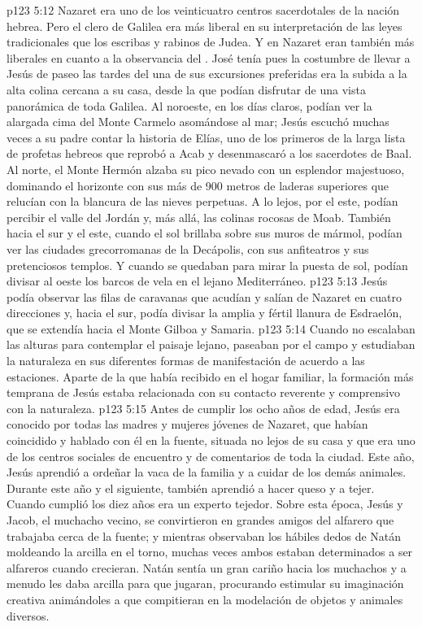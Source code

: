 \vs p123 5:12 \pc Nazaret era uno de los veinticuatro centros sacerdotales de la nación hebrea. Pero el clero de Galilea era más liberal en su interpretación de las leyes tradicionales que los escribas y rabinos de Judea. Y en Nazaret eran también más liberales en cuanto a la observancia del . José tenía pues la costumbre de llevar a Jesús de paseo las tardes del  una de sus excursiones preferidas era la subida a la alta colina cercana a su casa, desde la que podían disfrutar de una vista panorámica de toda Galilea. Al noroeste, en los días claros, podían ver la alargada cima del Monte Carmelo asomándose al mar; Jesús escuchó muchas veces a su padre contar la historia de Elías, uno de los primeros de la larga lista de profetas hebreos que reprobó a Acab y desenmascaró a los sacerdotes de Baal. Al norte, el Monte Hermón alzaba su pico nevado con un esplendor majestuoso, dominando el horizonte con sus más de 900 metros de laderas superiores que relucían con la blancura de las nieves perpetuas. A lo lejos, por el este, podían percibir el valle del Jordán y, más allá, las colinas rocosas de Moab. También hacia el sur y el este, cuando el sol brillaba sobre sus muros de mármol, podían ver las ciudades grecorromanas de la Decápolis, con sus anfiteatros y sus pretenciosos templos. Y cuando se quedaban para mirar la puesta de sol, podían divisar al oeste los barcos de vela en el lejano Mediterráneo.
\vs p123 5:13 Jesús podía observar las filas de caravanas que acudían y salían de Nazaret en cuatro direcciones y, hacia el sur, podía divisar la amplia y fértil llanura de Esdraelón, que se extendía hacia el Monte Gilboa y Samaria.
\vs p123 5:14 Cuando no escalaban las alturas para contemplar el paisaje lejano, paseaban por el campo y estudiaban la naturaleza en sus diferentes formas de manifestación de acuerdo a las estaciones. Aparte de la que había recibido en el hogar familiar, la formación más temprana de Jesús estaba relacionada con su contacto reverente y comprensivo con la naturaleza.
\vs p123 5:15 \pc Antes de cumplir los ocho años de edad, Jesús era conocido por todas las madres y mujeres jóvenes de Nazaret, que habían coincidido y hablado con él en la fuente, situada no lejos de su casa y que era uno de los centros sociales de encuentro y de comentarios de toda la ciudad. Este año, Jesús aprendió a ordeñar la vaca de la familia y a cuidar de los demás animales. Durante este año y el siguiente, también aprendió a hacer queso y a tejer. Cuando cumplió los diez años era un experto tejedor. Sobre esta época, Jesús y Jacob, el muchacho vecino, se convirtieron en grandes amigos del alfarero que trabajaba cerca de la fuente; y mientras observaban los hábiles dedos de Natán moldeando la arcilla en el torno, muchas veces ambos estaban determinados a ser alfareros cuando crecieran. Natán sentía un gran cariño hacia los muchachos y a menudo les daba arcilla para que jugaran, procurando estimular su imaginación creativa animándoles a que compitieran en la modelación de objetos y animales diversos.
